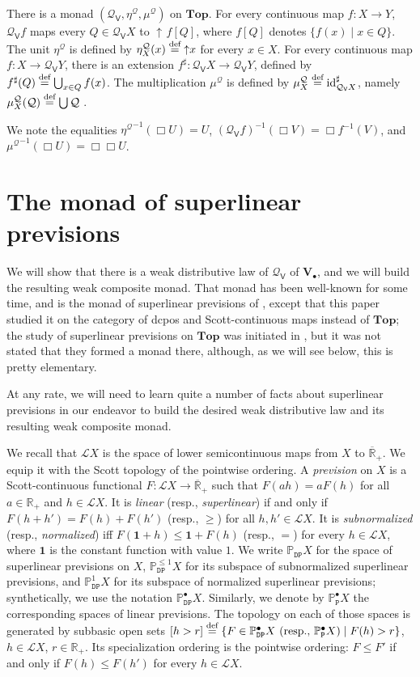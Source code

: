 \documentclass[preprint,12pt]{elsarticle}
\newcommand\eqdef{\mathrel{\buildrel \text{def}\over=}}
\newcommand{\creal}{\overline{\mathbb{R}}_+}
\newcommand{\Rp}{\mathbb{R}_+}
\DeclareMathOperator{\upc}{\uparrow\!}
\newcommand\Lform{\mathcal L}
\newcommand\identity[1]{\mathrm{id}_{#1}}
\newcommand\Pred{\mathbb{P}}
\newcommand\Demon{{\mathtt{D}}}
\newcommand\Nature{{\mathtt{P}}}
\newcommand\DN{{\Demon\Nature}}
\newcommand\one{\mathbf 1}
\newcommand\Smyth{{\mathcal Q}}
\newcommand\Vt{\mathsf{V}}
\newcommand\SV{\Smyth_{\Vt}}
\newcommand\Val{{\mathbf V}}
\newcommand\Topcat{\mathbf{Top}}
\begin{document}
There is a monad $(\SV, \eta^\Smyth, \mu^\Smyth)$ on $\Topcat$.  For
every continuous map $f \colon X \to Y$, $\SV f$ maps every
$Q \in \SV X$ to $\upc f [Q]$, where $f [Q]$ denotes
$\{f (x) \mid x \in Q\}$.  The unit $\eta^\Smyth$ is defined by
$\eta^\Smyth_X (x) \eqdef \upc x$ for every $x \in X$.  For every
continuous map $f \colon X \to \SV Y$, there is an extension
$f^\sharp \colon \SV X \to \SV Y$, defined by
$f^\sharp (Q) \eqdef \bigcup_{x \in Q} f (x)$.  The multiplication
$\mu^\Smyth$ is defined by
$\mu^\Smyth_X \eqdef \identity {\SV X}^\sharp$, namely
$\mu^\Smyth_X (\mathcal Q) \eqdef \bigcup \mathcal Q$
\cite[Proposition~7.21]{schalk:diss}.

We note the equalities ${\eta^\Smyth}^{-1} (\Box U) = U$,
${(\SV f)}^{-1} (\Box V) = \Box {f^{-1} (V)}$, and
${\mu^\Smyth}^{-1} (\Box U) = \Box {\Box U}$.

\section{The monad of superlinear previsions}
\label{sec:monad-superl-prev}

We will show that there is a weak distributive law of $\SV$ of
$\Val_\bullet$, and we will build the resulting weak composite monad.
That monad has been well-known for some time, and is the monad of
superlinear previsions of \cite{Gou-csl07}, except that this paper
studied it on the category of dcpos and Scott-continuous maps instead
of $\Topcat$; the study of superlinear previsions on $\Topcat$ was
initiated in \cite{JGL-mscs16}, but it was not stated that they formed
a monad there, although, as we will see below, this is pretty
elementary.

At any rate, we will need to learn quite a number of facts about
superlinear previsions in our endeavor to build the desired weak
distributive law and its resulting weak composite monad.

We recall that $\Lform X$ is the space of lower semicontinuous maps
from $X$ to $\creal$.  We equip it with the Scott topology of the
pointwise ordering.  A \emph{prevision} on $X$ is a Scott-continuous
functional $F \colon \Lform X \to \creal$ such that $F (ah)=aF(h)$ for
all $a \in \Rp$ and $h \in \Lform X$.  It is \emph{linear} (resp.,
\emph{superlinear}) if and only if $F (h+h')=F (h)+F (h')$ (resp.,
$\geq$) for all $h, h' \in \Lform X$.  It is \emph{subnormalized}
(resp., \emph{normalized}) iff $F (\one+h) \leq \one+F (h)$ (resp.,
$=$) for every $h \in \Lform X$, where $\one$ is the constant function
with value $1$.  We write $\Pred_\DN X$ for the space of superlinear
previsions on $X$, $\Pred_\DN^{\leq 1} X$ for its subspace of
subnormalized superlinear previsions, and $\Pred_\DN^1 X$ for its
subspace of normalized superlinear previsions; synthetically, we use
the notation $\Pred_\DN^\bullet X$.  Similarly, we denote by
$\Pred_\Nature^\bullet X$ the corresponding spaces of linear
previsions.  The topology on each of those spaces is generated by
subbasic open sets
$[h > r] \eqdef \{F \in \Pred_\DN^\bullet X \text{ (resp.,
  $\Pred_\Nature^\bullet X$)} \mid F (h) > r\}$, $h \in \Lform X$,
$r \in \Rp$.  Its specialization ordering is the pointwise ordering:
$F \leq F'$ if and only if $F (h) \leq F (h')$ for every
$h \in \Lform X$.
\end{document}
